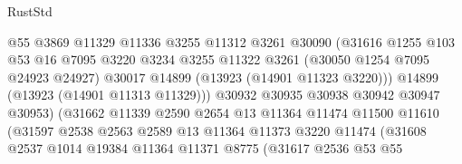 \begin{lexlean}{RustStd}
\begin{coremodule}
                                    @55
                                    @3869
                                    @11329
                                    @11336
                                    @3255
                                    @11312
                                    @3261
                                    @30090
                                    (@31616
                                      @1255
                                      @103
                                      @53
                                      @16
                                      @7095
                                      @3220
                                      @3234
                                      @3255
                                      @11322
                                      @3261
                                      (@30050 @1254 @7095 @24923 @24927)
                                      @30017
                                      @14899
                                      (@13923 (@14901 @11323 @3220)))
                                    @14899
                                    (@13923 (@14901 @11313 @11329)))
                                  @30932
                                  @30935
                                  @30938
                                  @30942
                                  @30947
                                  @30953)
                                (@31662
                                  @11339
                                  @2590
                                  @2654
                                  @13
                                  @11364
                                  @11474
                                  @11500
                                  @11610
                                  (@31597
                                    @2538
                                    @2563
                                    @2589
                                    @13
                                    @11364
                                    @11373
                                    @3220
                                    @11474
                                    (@31608
                                      @2537
                                      @1014
                                      @19384
                                      @11364
                                      @11371
                                      @8775
                                      (@31617
                                        @2536
                                        @53
                                        @55

\end{coremodule}
\end{lexlean}
